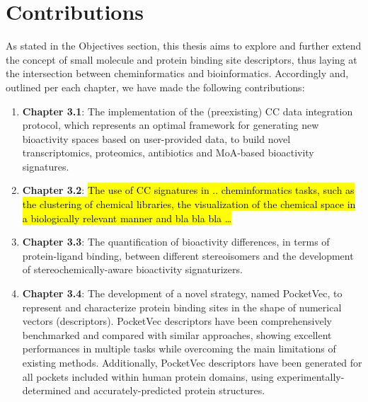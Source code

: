 \chapter{Contributions}
\label{Contributions}
\clearpage

As stated in the Objectives section, this thesis aims to explore and further extend the concept of small molecule and protein binding site descriptors, thus laying at the intersection between cheminformatics and bioinformatics. Accordingly and, outlined per each chapter, we have made the following contributions:

\begin{enumerate}

\item \textbf{Chapter 3.1}: The implementation of the (preexisting) CC data integration protocol, which represents an optimal framework for generating new bioactivity spaces based on user-provided data, to build novel transcriptomics, proteomics, antibiotics and MoA-based bioactivity signatures. 

\item \textbf{Chapter 3.2}: \hl{The use of CC signatures in .. cheminformatics tasks, such as the clustering of chemical libraries, the visualization of the chemical space in a biologically relevant manner and bla bla bla …}

\item \textbf{Chapter 3.3}: The quantification of bioactivity differences, in terms of protein-ligand binding, between different stereoisomers and the development of stereochemically-aware bioactivity signaturizers. 

\item \textbf{Chapter 3.4}: The development of a novel strategy, named PocketVec, to represent and characterize protein binding sites in the shape of numerical vectors (descriptors). PocketVec descriptors have been comprehensively benchmarked and compared with similar approaches, showing excellent performances in multiple tasks while overcoming the main limitations of existing methods. Additionally, PocketVec descriptors have been generated for all pockets included within human protein domains, using experimentally-determined and accurately-predicted protein structures. 

\end{enumerate}